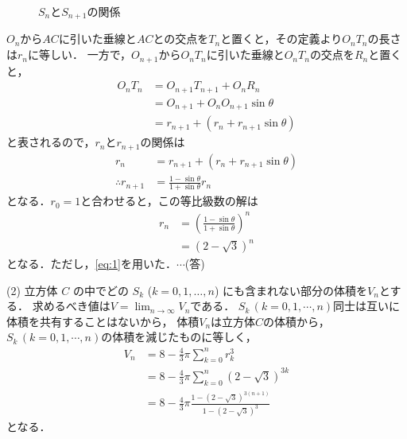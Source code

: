 \documentclass[a4paper,10pt]{ltjsarticle}
\begin{document}
\begin{multicols}{2}
\begin{figure}[H]
\caption{$S_n$と$S_{n+1}$の関係}
\label{fig:3}
\end{figure}

$O_n$から$AC$に引いた垂線と$AC$との交点を$T_n$と置くと，その定義より$O_nT_n$の長さは$r_n$に等しい．
一方で，$O_{n+1}$から$O_nT_n$に引いた垂線と$O_nT_n$の交点を$R_n$と置くと，
\begin{align*}
O_nT_n
&=O_{n+1}T_{n+1}+O_nR_n \\
&=O_{n+1}+O_nO_{n+1}\sin\theta \\
&=r_{n+1}+\left(r_{n}+r_{n+1}\sin\theta\right)
\end{align*}
と表されるので，$r_n$と$r_{n+1}$の関係は
\begin{align}
r_{n}
&=r_{n+1}+(r_{n}+r_{n+1}\sin\theta) \\
\therefore
r_{n+1} &= \frac{1-\sin\theta}{1+\sin\theta} r_{n}
\end{align}
となる．$r_0=1$と合わせると，この等比級数の解は
\begin{align}
    r_{n} 
    &= \left(\frac{1-\sin\theta}{1+\sin\theta}\right)^n \\
    &= (2-\sqrt{3})^n
\end{align}
となる．ただし，\cref{eq:1}を用いた．$\cdots$(答)

\vspace{10pt}
(2)
立方体 $C$ の中でどの $S_k$ ($k=0,1,\ldots, n$) にも含まれない部分の体積を$V_n$とする．
求めるべき値は$\displaystyle V = \lim_{n\to\infty}V_n$である．
$S_k\, (k=0,1,\cdots,n)$同士は互いに体積を共有することはないから，
体積$V_n$は立方体$C$の体積から，$S_k\, (k=0,1,\cdots,n)$の体積を減じたものに等しく，
\begin{align*}
    V_n &= 8 - \frac{4}{3}\pi \sum_{k=0}^{n} r_k^3 \\
    &= 8 - \frac{4}{3}\pi \sum_{k=0}^{n} (2-\sqrt{3})^{3k} \\
    &= 8 - \frac{4}{3}\pi \frac{1-(2-\sqrt{3})^{3(n+1)}}{1-(2-\sqrt{3})^3}
\end{align*}
となる．


\end{multicols}
\end{document}
